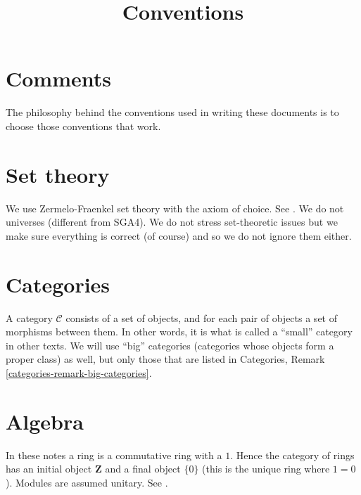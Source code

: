 

%


\title{Conventions}


\maketitle

\label{section-phantom}

\tableofcontents

\section{Comments}
\label{section-comments}

\noindent
The philosophy behind the conventions used in writing these documents is
to choose those conventions that work.

\section{Set theory}
\label{section-sets}

\noindent
We use Zermelo-Fraenkel set theory with the axiom of choice.
See \cite{Kunen}. We do not
universes (different from SGA4). We do not stress set-theoretic issues
but we make sure everything is correct (of course) and so we do not ignore
them either.


\section{Categories}
\label{section-categories}

\noindent
A category $\mathcal{C}$ consists of a set of objects, and for each pair
of objects
a set of morphisms between them. In other words, it is what is called
a ``small'' category in other texts. We will use ``big'' categories
(categories whose objects form a proper class)
as well, but only those that are listed in Categories,
Remark \ref{categories-remark-big-categories}.

\section{Algebra}
\label{section-algebra}

\noindent
In these notes a ring is a commutative ring with a $1$. Hence the
category of rings has an initial object $\mathbf{Z}$ and a final
object $\{0\}$ (this is the unique ring where $1 = 0$). Modules are
assumed unitary. See \cite{Eisenbud}.







